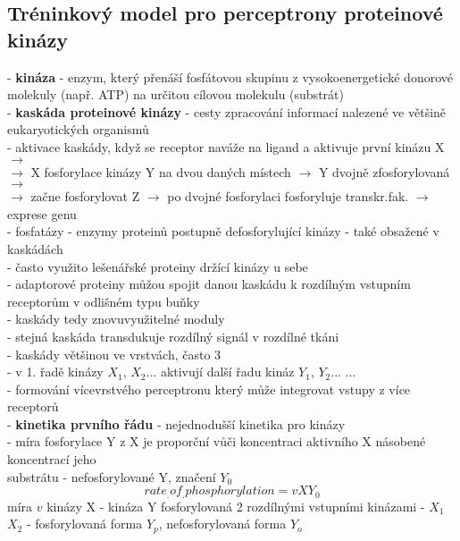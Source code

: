 \documentclass[11pt,a4paper]{report}
\begin{document}
\subsection{Tréninkový model pro perceptrony proteinové kinázy}
- \textbf{kináza} - enzym, který přenáší fosfátovou skupinu z vysokoenergetické donorové molekuly (např. ATP) na určitou cílovou molekulu (substrát)\\
- \textbf{kaskáda proteinové kinázy} - cesty zpracování informací nalezené ve většině eukaryotických organismů\\
- aktivace kaskády, když se receptor naváže na ligand a aktivuje první kinázu X $\rightarrow$ \\
\indent $\rightarrow$ X fosforylace kinázy Y na dvou daných místech $\rightarrow$ Y dvojně zfosforylovaná $\rightarrow$ \\ \indent $\rightarrow$ začne fosforylovat Z $\rightarrow$ po dvojné fosforylaci fosforyluje transkr.fak. $\rightarrow$ exprese genu\\
- fosfatázy - enzymy proteinů postupně defosforylující kinázy - také obsažené v kaskádách\\
- často využito lešenářské proteiny držící kinázy u sebe\\
- adaptorové proteiny můžou spojit danou kaskádu k rozdílným vstupním receptorům v odlišném typu buňky\\
\indent - kaskády tedy znovuvyužitelné moduly\\ 
\indent - stejná kaskáda transdukuje rozdílný signál v rozdílné tkáni\\
- kaskády většinou ve vrstvách, často 3\\
\indent - v 1. řadě kinázy $X_1$, $X_2$... aktivují další řadu kináz $Y_1$, $Y_2$... ...\\
\indent \indent - formování vícevrstvého perceptronu který může integrovat vstupy z více receptorů\\
- \textbf{kinetika prvního řádu} - nejednodušší kinetika pro kinázy\\
\indent - míra fosforylace Y z X je proporční vůči koncentraci aktivního X násobené koncentrací jeho\\
\indent \indent substrátu - nefosforylované Y, značení $Y_0$\\
\begin{equation}
rate_.of_.phosphorylation=vXY_0
\end{equation}
\indent míra $v$ kinázy X
- kináza Y fosforylovaná 2 rozdílnými vstupními kinázami - $X_1$ $X_2$
\indent - fosforylovaná forma $Y_p$, nefosforylovaná forma $Y_o$\\
\end{document}
